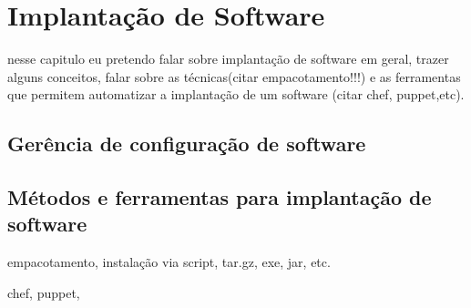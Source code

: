 \chapter{Implantação de Software}
\label{cap-implantacao}

nesse capitulo eu pretendo falar sobre implantação de software em geral, trazer
alguns conceitos, falar sobre as técnicas(citar empacotamento!!!) e as ferramentas
que permitem automatizar a implantação de um software (citar chef, puppet,etc).

\section{Gerência de configuração de software}

\section{Métodos e ferramentas para implantação de software}

empacotamento, instalação via script, tar.gz, exe, jar, etc.

chef, puppet,
%
